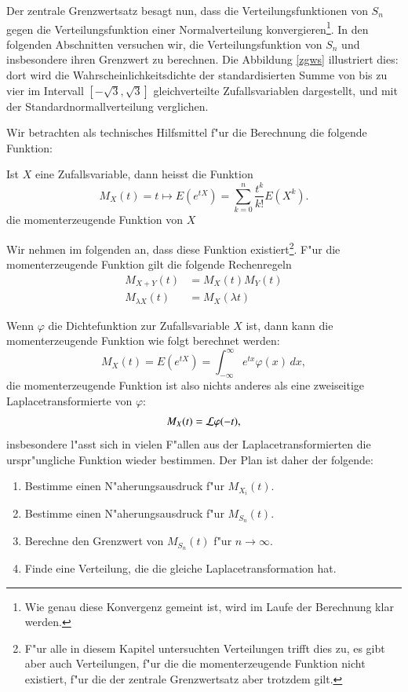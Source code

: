 Der zentrale Grenzwertsatz besagt nun, dass die Verteilungsfunktionen
von $S_n$ gegen die Verteilungsfunktion einer Normalverteilung
konvergieren\footnote{Wie genau diese Konvergenz gemeint ist, wird
im Laufe der Berechnung klar werden.}.
In den folgenden Abschnitten
versuchen wir, die Verteilungsfunktion von $S_n$ und insbesondere
ihren Grenzwert zu berechnen.
Die Abbildung \ref{zgws} illustriert
dies: dort wird die Wahrscheinlichkeitsdichte der standardisierten
Summe von bis zu vier im
Intervall $[-\sqrt{3},\sqrt{3}]$ gleichverteilte Zufallsvariablen dargestellt,
und mit der Standardnormallverteilung verglichen.

Wir betrachten als technisches Hilfsmittel f"ur die Berechnung
die folgende Funktion:
\begin{definition} Ist $X$ eine Zufallsvariable, dann heisst die Funktion
\[
M_X(t)=t\mapsto E(e^{tX})=\sum_{k=0}^n\frac{t^k}{k!}E(X^k).
\]
die momenterzeugende Funktion von $X$
\end{definition}
Wir nehmen im folgenden
an, dass diese Funktion existiert\footnote{F"ur alle in diesem Kapitel
untersuchten Verteilungen trifft dies zu, es gibt aber auch Verteilungen,
f"ur die die momenterzeugende Funktion nicht existiert, f"ur die der
zentrale Grenzwertsatz aber trotzdem gilt.}.
F"ur die momenterzeugende
Funktion gilt die folgende Rechenregeln
\begin{align*}
M_{X+Y}(t)&=M_X(t)M_Y(t)\\
M_{\lambda X}(t)&=M_X(\lambda t)
\end{align*}

Wenn $\varphi$ die Dichtefunktion zur Zufallsvariable $X$ ist, dann
kann die momenterzeugende Funktion wie folgt berechnet werden:
\[
M_X(t)=E(e^{tX})=\int_{-\infty}^\infty e^{tx}\varphi(x)\,dx,
\]
die momenterzeugende Funktion ist also nichts anderes als eine
zweiseitige Laplacetransformierte von $\varphi$:
\[
M_X(t)={\cal L}\varphi(-t),
\]
insbesondere l"asst sich in vielen F"allen aus der Laplacetransformierten
die urspr"ungliche Funktion wieder bestimmen.
Der Plan ist daher der folgende:
\begin{enumerate}
\item Bestimme einen N"aherungsausdruck f"ur $M_{X_i}(t)$.
\item Bestimme einen N"aherungsausdruck f"ur $M_{S_n}(t)$.
\item Berechne den Grenzwert von $M_{S_n}(t)$ f"ur $n\to\infty$.
\item Finde eine Verteilung, die die gleiche Laplacetransformation
hat.
\end{enumerate}

